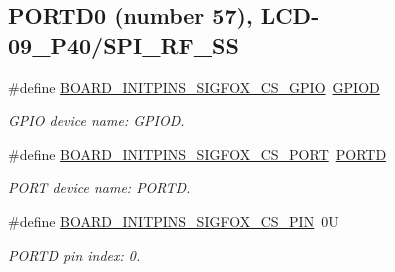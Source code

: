 \subsection*{P\+O\+R\+T\+D0 (number 57), L\+C\+D-\/09\+\_\+\+P40/\+S\+P\+I\+\_\+\+R\+F\+\_\+\+SS}
\begin{DoxyCompactItemize}
\item 
\mbox{\label{group__pin__mux_ga623dbc09cc1ef8735bcebcf0bc109c48}} 
\#define \mbox{\hyperlink{group__pin__mux_ga623dbc09cc1ef8735bcebcf0bc109c48}{B\+O\+A\+R\+D\+\_\+\+I\+N\+I\+T\+P\+I\+N\+S\+\_\+\+S\+I\+G\+F\+O\+X\+\_\+\+C\+S\+\_\+\+G\+P\+IO}}~\mbox{\hyperlink{group___g_p_i_o___peripheral___access___layer_ga7580b1a929ea9df59725ba9c18eba6ac}{G\+P\+I\+OD}}
\begin{DoxyCompactList}\small\item\em G\+P\+IO device name\+: G\+P\+I\+OD. \end{DoxyCompactList}\item 
\mbox{\label{group__pin__mux_gaeaf53becf5088ebad55718b11d70dfca}} 
\#define \mbox{\hyperlink{group__pin__mux_gaeaf53becf5088ebad55718b11d70dfca}{B\+O\+A\+R\+D\+\_\+\+I\+N\+I\+T\+P\+I\+N\+S\+\_\+\+S\+I\+G\+F\+O\+X\+\_\+\+C\+S\+\_\+\+P\+O\+RT}}~\mbox{\hyperlink{group___p_o_r_t___peripheral___access___layer_ga3e6a2517db4f9cb7c9037adf0aefe79b}{P\+O\+R\+TD}}
\begin{DoxyCompactList}\small\item\em P\+O\+RT device name\+: P\+O\+R\+TD. \end{DoxyCompactList}\item 
\mbox{\label{group__pin__mux_ga6b8120e5a3844dace941b480bcfeb445}} 
\#define \mbox{\hyperlink{group__pin__mux_ga6b8120e5a3844dace941b480bcfeb445}{B\+O\+A\+R\+D\+\_\+\+I\+N\+I\+T\+P\+I\+N\+S\+\_\+\+S\+I\+G\+F\+O\+X\+\_\+\+C\+S\+\_\+\+P\+IN}}~0U
\begin{DoxyCompactList}\small\item\em P\+O\+R\+TD pin index\+: 0. \end{DoxyCompactList}\end{DoxyCompactItemize}
